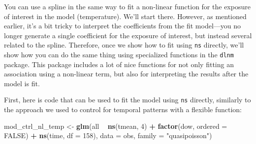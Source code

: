 \documentclass[
]{book}
\newenvironment{Shaded}{\begin{snugshade}}{\end{snugshade}}
\newcommand{\DataTypeTok}[1]{\textcolor[rgb]{0.13,0.29,0.53}{#1}}
\newcommand{\DecValTok}[1]{\textcolor[rgb]{0.00,0.00,0.81}{#1}}
\newcommand{\FloatTok}[1]{\textcolor[rgb]{0.00,0.00,0.81}{#1}}
\newcommand{\KeywordTok}[1]{\textcolor[rgb]{0.13,0.29,0.53}{\textbf{#1}}}
\newcommand{\NormalTok}[1]{#1}
\newcommand{\OperatorTok}[1]{\textcolor[rgb]{0.81,0.36,0.00}{\textbf{#1}}}
\newcommand{\OtherTok}[1]{\textcolor[rgb]{0.56,0.35,0.01}{#1}}
\newcommand{\StringTok}[1]{\textcolor[rgb]{0.31,0.60,0.02}{#1}}
\begin{document}
You can use a spline in the same way to fit a non-linear function for the
exposure of interest in the model (temperature). We'll start there. However,
as mentioned earlier, it's a bit tricky to interpret the coefficients from the
fit model---you no longer generate a single coefficient for the exposure of
interest, but instead several related to the spline. Therefore, once we show
how to fit using \texttt{ns} directly, we'll show how you can do the same thing using
specialized functions in the \texttt{dlnm} package. This package includes a lot of
nice functions for not only fitting an association using a non-linear term,
but also for interpreting the results after the model is fit.

First, here is code that can be used to fit the model using \texttt{ns} directly,
similarly to the approach we used to control for temporal patterns with a
flexible function:

\begin{Shaded}
\begin{Highlighting}[]
\NormalTok{mod_ctrl_nl_temp <-}\StringTok{ }\KeywordTok{glm}\NormalTok{(all }\OperatorTok{~}\StringTok{ }\KeywordTok{ns}\NormalTok{(tmean, }\DecValTok{4}\NormalTok{) }\OperatorTok{+}\StringTok{ }\KeywordTok{factor}\NormalTok{(dow, }\DataTypeTok{ordered =} \OtherTok{FALSE}\NormalTok{) }\OperatorTok{+}
\StringTok{                          }\KeywordTok{ns}\NormalTok{(time, }\DataTypeTok{df =} \DecValTok{158}\NormalTok{), }
                        \DataTypeTok{data =}\NormalTok{ obs, }\DataTypeTok{family =} \StringTok{"quasipoisson"}\NormalTok{)}
\end{Highlighting}
\end{Shaded}

\begin{Shaded}
\end{Shaded}
\end{document}
